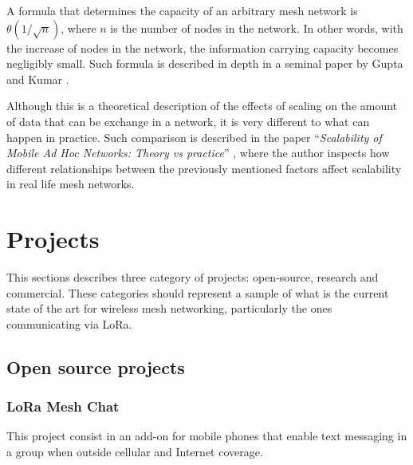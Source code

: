 			A formula that determines the capacity of an arbitrary mesh network is~$\theta(1/\sqrt{n})$, where $ n $ is the number of nodes in the network.
			In other words, with the increase of nodes in the network, the information carrying capacity becomes negligibly small.
			Such formula is described in depth in a seminal paper by Gupta and Kumar \cite{825799}.
			
			Although this is a theoretical description of the effects of scaling on the amount of data that can be exchange in a network, it is very different to what can happen in practice.
			Such comparison is described in the paper ``\textit{Scalability of Mobile Ad Hoc Networks: Theory vs practice}''  \cite{5680385}, where the author inspects how different relationships between the previously mentioned factors affect scalability in real life mesh networks.
	
%	
		
	
	
	\section{Projects}\label{sec:chap4_projects}
		
		This sections describes three category of projects: open-source, research and commercial.
		These categories should represent a sample of what is the current state of the art for wireless mesh networking, particularly the ones communicating via LoRa.
		
		\subsection{Open source projects}
		
			\subsubsection{LoRa Mesh Chat}\label{subsubsec:lorameshchat}

				This project consist in an add-on for mobile phones that enable text messaging in a group when outside cellular and Internet coverage.	
			
